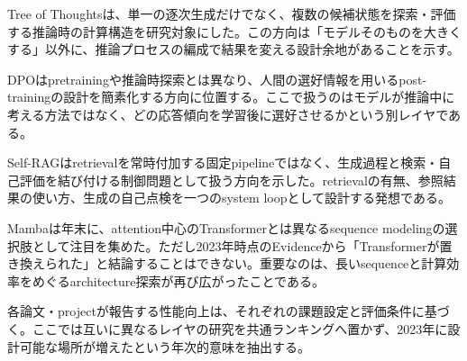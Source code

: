 
Tree of Thoughtsは、単一の逐次生成だけでなく、複数の候補状態を探索・評価する推論時の計算構造を研究対象にした。この方向は「モデルそのものを大きくする」以外に、推論プロセスの編成で結果を変える設計余地があることを示す。\autocite{src-8a38211129c4}


DPOはpretrainingや推論時探索とは異なり、人間の選好情報を用いるpost-trainingの設計を簡素化する方向に位置する。ここで扱うのはモデルが推論中に考える方法ではなく、どの応答傾向を学習後に選好させるかという別レイヤである。\autocite{src-21aef0026892}


Self-RAGはretrievalを常時付加する固定pipelineではなく、生成過程と検索・自己評価を結び付ける制御問題として扱う方向を示した。retrievalの有無、参照結果の使い方、生成の自己点検を一つのsystem loopとして設計する発想である。\autocite{src-e413c7ab8da4}


Mambaは年末に、attention中心のTransformerとは異なるsequence modelingの選択肢として注目を集めた。ただし2023年時点のEvidenceから「Transformerが置き換えられた」と結論することはできない。重要なのは、長いsequenceと計算効率をめぐるarchitecture探索が再び広がったことである。\autocite{src-5dd64e15cc75}


\begin{claimboundary}
各論文・projectが報告する性能向上は、それぞれの課題設定と評価条件に基づく。ここでは互いに異なるレイヤの研究を共通ランキングへ置かず、2023年に設計可能な場所が増えたという年次的意味を抽出する。\autocite{src-8a38211129c4}
\end{claimboundary}
